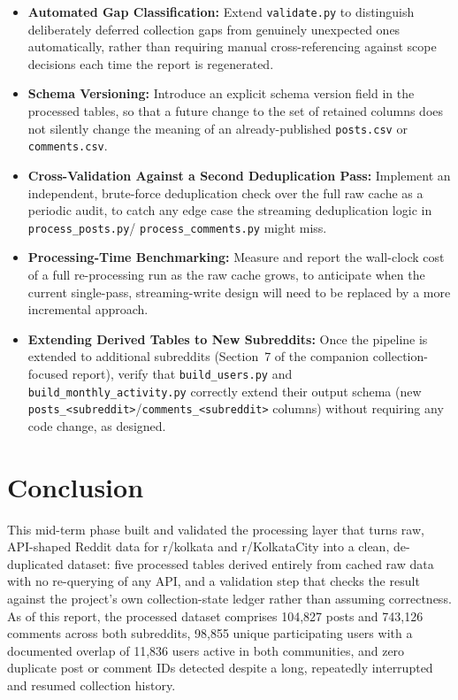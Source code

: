 \documentclass[12pt]{article}
\begin{document}
\begin{itemize}
    \item \textbf{Automated Gap Classification:} Extend \texttt{validate.py} to distinguish
    deliberately deferred collection gaps from genuinely unexpected ones automatically, rather
    than requiring manual cross-referencing against scope decisions each time the report is
    regenerated.

    \item \textbf{Schema Versioning:} Introduce an explicit schema version field in the processed
    tables, so that a future change to the set of retained columns does not silently change the
    meaning of an already-published \texttt{posts.csv} or \texttt{comments.csv}.

    \item \textbf{Cross-Validation Against a Second Deduplication Pass:} Implement an independent,
    brute-force deduplication check over the full raw cache as a periodic audit, to catch any
    edge case the streaming deduplication logic in \texttt{process\_posts.py}/
    \texttt{process\_comments.py} might miss.

    \item \textbf{Processing-Time Benchmarking:} Measure and report the wall-clock cost of a full
    re-processing run as the raw cache grows, to anticipate when the current single-pass,
    streaming-write design will need to be replaced by a more incremental approach.

    \item \textbf{Extending Derived Tables to New Subreddits:} Once the pipeline is extended to
    additional subreddits (Section~7 of the companion collection-focused report), verify that
    \texttt{build\_users.py} and \texttt{build\_monthly\_activity.py} correctly extend their
    output schema (new \texttt{posts\_<subreddit>}/\texttt{comments\_<subreddit>} columns) without
    requiring any code change, as designed.
\end{itemize}


\section{Conclusion}

This mid-term phase built and validated the processing layer that turns raw, API-shaped Reddit
data for r/kolkata and r/KolkataCity into a clean, de-duplicated dataset: five processed tables
derived entirely from cached raw data with no re-querying of any API, and a validation step that
checks the result against the project's own collection-state ledger rather than assuming
correctness. As of this report, the processed dataset comprises 104,827 posts and 743,126
comments across both subreddits, 98,855 unique participating users with a documented overlap of
11,836 users active in both communities, and zero duplicate post or comment IDs detected despite
a long, repeatedly interrupted and resumed collection history.
\end{document}
